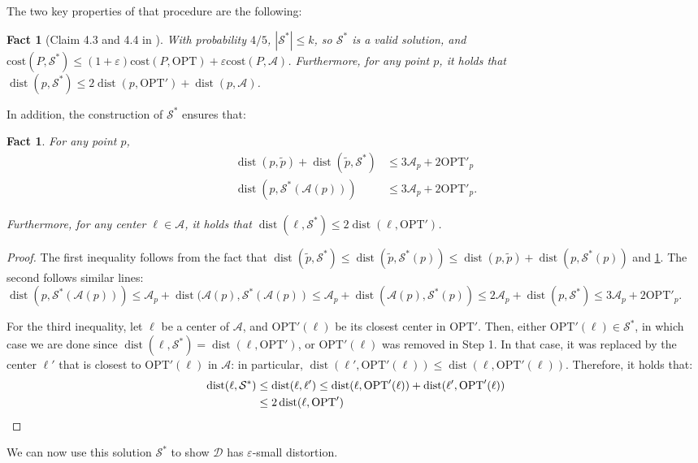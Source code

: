 \documentclass[11pt]{article}
\newtheorem{fact}[theorem]{Fact}
\newcommand{\opt}{\text{OPT}}
\newcommand{\eps}{\varepsilon}
\newcommand{\cost}{\mathrm{cost}}
\renewcommand{\tilde}{\widetilde}
\newcommand{\calD}{\mathcal {D}}
\newcommand{\calS}{\mathcal {S}}
\newcommand{\calL}{\mathcal{A}}
\DeclareMathOperator{\dist}{dist}
\begin{document}
The two key properties of that procedure are the following:
\begin{fact}[Claim 4.3 and 4.4 in \cite{jacm}]\label{fact:propSstar}
With probability $4/5$, $|\calS^*| \leq k$, so $\calS^*$ is a valid solution, and $\cost(P,  \calS^*) \leq (1+\eps)\cost(P, \opt) + \eps \cost(P, \calL)$.
 Furthermore, for any point $p$,
  it holds that $\dist(p, \calS^*) \leq 2\dist(p, \opt') + \dist(p, \calL)$.  
\end{fact}
In addition, the construction of $\calS^*$ ensures that:
\begin{fact}\label{fact:ineq}
For any point $p$,
\begin{align*}
\dist(p, \tilde p) + \dist(\tilde p, \calS^*) &\leq 3\calL_p + 2\opt'_p\\
\dist(p, \calS^*(\calL(p))) &\leq 3\calL_p + 2\opt'_p.
\end{align*}

Furthermore, for any center $\ell \in \calL$, it holds that $\dist(\ell, \calS^*) \leq 2\dist(\ell, \opt')$.
\end{fact}
\begin{proof}
The first inequality follows from the fact that $\dist(\tilde p, \calS^*) \leq \dist(\tilde p, \calS^*(p)) \leq \dist(p, \tilde p) + \dist(p, \calS^*(p))$ and \cref{fact:propSstar}. 
The second follows similar lines: 
$\dist(p, \calS^*(\calL(p))) \leq \calL_p + \dist(\calL(p), \calS^*(\calL(p)) \leq \calL_p + \dist(\calL(p), \calS^*(p)) \leq 2\calL_p + \dist(p, \calS^*) \leq 3\calL_p + 2\opt'_p$.

For the third inequality, let $\ell$ be a center of $\calL$, and $\opt'(\ell)$ be its closest center in $\opt'$. Then, either $\opt'(\ell) \in \calS^*$, in which case we are done since $\dist(\ell, \calS^*) = \dist(\ell, \opt')$, or $\opt'(\ell)$ was removed in Step 1. 
In that case, it was replaced by the center $\ell'$ that is closest to $\opt'(\ell)$ in $\calL$: in particular, $\dist(\ell', \opt'(\ell)) \leq \dist(\ell, \opt'(\ell))$. Therefore, it holds that:
\begin{align*}
    \dist(\ell, \calS^*) &\leq \dist(\ell, \ell') \leq \dist(\ell, \opt'(\ell)) + \dist(\ell', \opt'(\ell)) 
    \\ &\leq 2\dist(\ell, \opt')\qedhere
\end{align*}
\end{proof}

We can now use this solution $ \calS^*$ to show $\calD$ has $\eps$-small distortion. 
\end{document}
